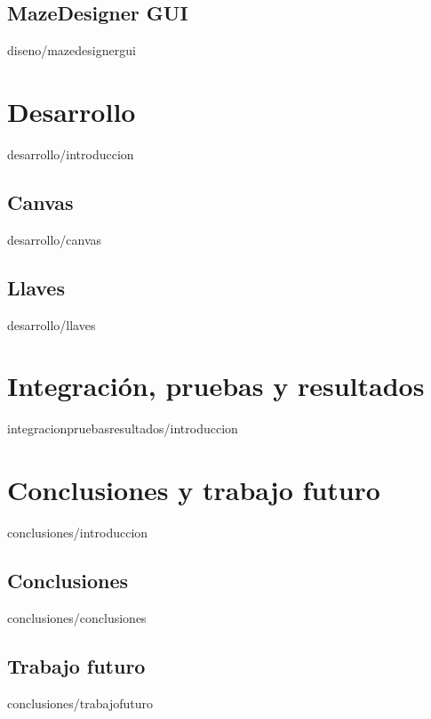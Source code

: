 \documentclass[epsbased,copyright,final,printable,covers,extendedindex,firstnumbered,tfg,gnuplot]{tfgtfmthesisuam}
\begin{document}
	\section{MazeDesigner GUI\label{SUBSEC:GUI}}{diseno/mazedesignergui}

\chapter{Desarrollo\label{CAP:DESARROLLO}}{desarrollo/introduccion}
	\section{Canvas\label{SUBSEC:DEVCANVAS}}{desarrollo/canvas}
	\section{Llaves\label{SUBSEC:DEVLLAVES}}{desarrollo/llaves}

\chapter{Integración, pruebas y resultados\label{CAP:INTEGRACIONPRUEBASYRESULTADOS}}{integracionpruebasresultados/introduccion}

\chapter{Conclusiones y trabajo futuro\label{CAP:CONCLUSIONES}}{conclusiones/introduccion}
	\section{Conclusiones\label{SEC:CONCLUSIONES}}{conclusiones/conclusiones}
	\section{Trabajo futuro\label{SEC:TRABAJOFUTURO}}{conclusiones/trabajofuturo}
\end{document}
